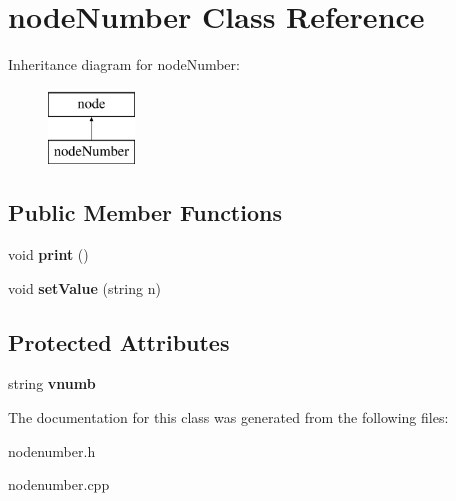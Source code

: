 \hypertarget{classnodeNumber}{\section{node\-Number \-Class \-Reference}
\label{classnodeNumber}
}
\-Inheritance diagram for node\-Number\-:\begin{figure}[H]
\begin{center}
\leavevmode
\includegraphics[height=2.000000cm]{classnodeNumber}
\end{center}
\end{figure}
\subsection*{\-Public \-Member \-Functions}
\begin{DoxyCompactItemize}
\item 
\hypertarget{classnodeNumber_aa65a8b7f5279b25a454d88565b001b85}{void {\bfseries print} ()}\label{classnodeNumber_aa65a8b7f5279b25a454d88565b001b85}

\item 
\hypertarget{classnodeNumber_a1f36b721fdd6e6895abd987289989633}{void {\bfseries set\-Value} (string n)}\label{classnodeNumber_a1f36b721fdd6e6895abd987289989633}

\end{DoxyCompactItemize}
\subsection*{\-Protected \-Attributes}
\begin{DoxyCompactItemize}
\item 
\hypertarget{classnodeNumber_af8a054853bba353630015b21753775a2}{string {\bfseries vnumb}}\label{classnodeNumber_af8a054853bba353630015b21753775a2}

\end{DoxyCompactItemize}


\-The documentation for this class was generated from the following files\-:\begin{DoxyCompactItemize}
\item 
nodenumber.\-h\item 
nodenumber.\-cpp\end{DoxyCompactItemize}
